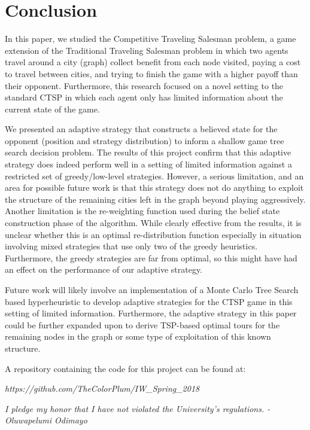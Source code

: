 \documentclass[pageno]{jpaper}
\begin{document}
\section{Conclusion}

In this paper, we studied the Competitive Traveling Salesman problem, a game extension of the Traditional Traveling Salesman problem in which two agents travel around a city (graph) collect benefit from each node visited, paying a cost to travel between cities, and trying to finish the game with a higher payoff than their opponent. Furthermore, this research focused on a novel setting to the standard CTSP in which each agent only has limited information about the current state of the game.\par
We presented an adaptive strategy that constructs a believed state for the opponent (position and strategy distribution) to inform a shallow game tree search decision problem. The results of this project confirm that this adaptive strategy does indeed perform well in a setting of limited information against a restricted set of greedy/low-level strategies. However, a serious limitation, and an area for possible future work is that this strategy does not do anything to exploit the structure of the remaining cities left in the graph beyond playing aggressively. Another limitation is the re-weighting function used during the belief state construction phase of the algorithm. While clearly effective from the results, it is unclear whether this is an optimal re-distribution function especially in situation involving mixed strategies that use only two of the greedy heuristics.  Furthermore, the greedy strategies are far from optimal, so this might have had an effect on the performance of our adaptive strategy.\par 
Future work will likely involve an implementation of a Monte Carlo Tree Search based hyperheuristic to develop adaptive strategies for the CTSP game in this setting of limited information. Furthermore, the adaptive strategy in this paper could be further expanded upon to derive TSP-based optimal tours for the remaining nodes in the graph or some type of exploitation of this known structure.

A repository containing the code for this project can be found at:\newline
\begin{center}
	\textit{https://github.com/TheColorPlum/IW\_Spring\_2018}\newpage
\end{center} 




\textit{I pledge my honor that I have not violated the University's regulations. - Oluwapelumi Odimayo}
\end{document}
